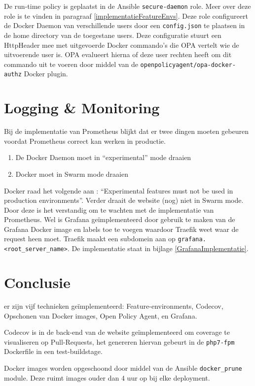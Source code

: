 De run-time policy is geplaatst in de Ansible \texttt{secure-daemon} role. Meer over deze role is te vinden in paragraaf \ref{implementatieFeatureEnvs}. Deze role configureert de Docker Daemon van verschillende users door een \texttt{config.json} te plaatsen in de home directory van de toegestane users. Deze configuratie stuurt een HttpHeader mee met uitgevoerde Docker commando's die OPA vertelt wie de uitvoerende user is. OPA evalueert hierna of deze user rechten heeft om dit commando uit te voeren door middel van de \texttt{openpolicyagent/opa-docker-authz} Docker plugin.

\section{Logging \& Monitoring}
Bij de implementatie van Prometheus blijkt dat er twee dingen moeten gebeuren voordat Prometheus correct kan werken in productie. 
\begin{enumerate}
    \item De Docker Daemon moet in \enquote{experimental} mode draaien
    \item Docker moet in Swarm mode draaien
\end{enumerate}
Docker raad het volgende aan \parencite{DockerExperimental}: \enquote{Experimental features must not be used in production environments}. Verder draait de website (nog) niet in Swarm mode. Door deze is het verstandig om te wachten met de implementatie van Prometheus. Wel is Grafana geïmplementeerd door gebruik te maken van de Grafana Docker image en labels toe te voegen waardoor Traefik weet waar de request heen moet. Traefik maakt een subdomein aan op \texttt{grafana.<root\_server\_name>}. De implementatie staat in bijlage \ref{GrafanaImplementatie}.

\section{Conclusie}

er zijn vijf technieken geïmplementeerd: Feature-environments, Codecov, Opschonen van Docker images, Open Policy Agent, en Grafana.

Codecov is in de back-end van de website geïmplementeerd om coverage te visualiseren op Pull-Requests, het genereren hiervan gebeurt in de \texttt{php7-fpm} Dockerfile in een test-buildstage.

Docker images worden opgeschoond door middel van de Ansible \texttt{docker\_prune} module. Deze ruimt images ouder dan 4 uur op bij elke deployment.

